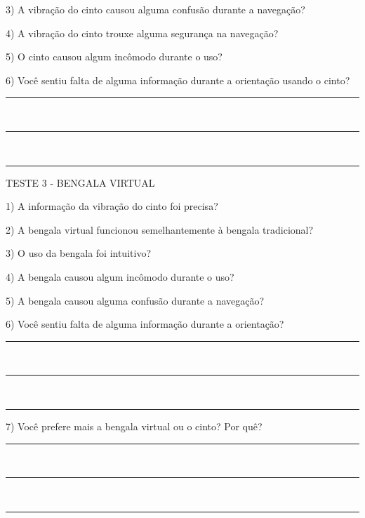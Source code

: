 3)	A vibração do cinto causou alguma confusão durante a navegação?



4)	A vibração do cinto trouxe alguma segurança na navegação?



5)	O cinto causou algum incômodo durante o uso?



6)	Você sentiu falta de alguma informação durante a orientação usando o cinto?

\noindent
\rule{6in}{.2mm} \\
\rule{6in}{.2mm} \\
\rule{6in}{.2mm}

\vspace{2cm}

{\large TESTE 3 - BENGALA VIRTUAL}

1)	A informação da vibração do cinto foi precisa?



2)	A bengala virtual funcionou semelhantemente à bengala tradicional?



3)	O uso da bengala foi intuitivo?



4)	A bengala causou algum incômodo durante o uso?



5)	A bengala causou alguma confusão durante a navegação?



6)	Você sentiu falta de alguma informação durante a orientação?

\noindent
\rule{6in}{.2mm} \\
\rule{6in}{.2mm} \\
\rule{6in}{.2mm}

7)	Você prefere mais a bengala virtual ou o cinto? Por quê?

\noindent
\rule{6in}{.2mm} \\
\rule{6in}{.2mm} \\
\rule{6in}{.2mm}

